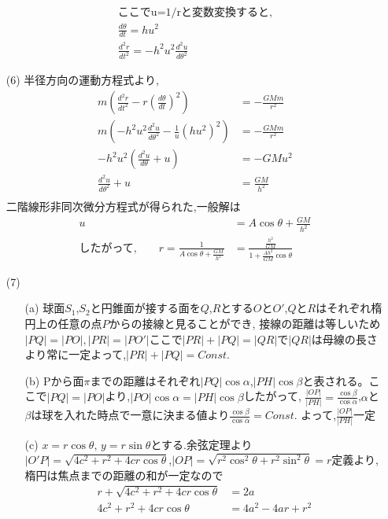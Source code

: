 \documentclass{jsarticle}
\begin{document}
\begin{itemize}
\begin{align*}
    \text{ここでu=1/rと変数変換すると,}\\
    \frac{d\theta}{dt} = hu^2\\
    \frac{d^2r}{dt^2} = -h^2u^2\frac{d^2u}{d\theta^2}
  \end{align*} 
  \item[(6)] 半径方向の運動方程式より,
  \begin{align*}
    m(\frac{d^2r}{dt^2} - r(\frac{d\theta}{dt})^2) &= -\frac{GMm}{r^2}\\
    m( -h^2u^2\frac{d^2u}{d\theta^2} -\frac{1}{u}(hu^2)^2) &= -\frac{GMm}{r^2}\\
    -h^2u^2(\frac{d^2u}{d\theta} + u) &= -GMu^2\\
    \frac{d^2u}{d\theta^2} + u &= \frac{GM}{h^2}\\
  \end{align*}  
二階線形非同次微分方程式が得られた,一般解は
  \begin{align*}
    u &= A\cos\theta + \frac{GM}{h^2}\\
    \text{したがって,}\qquad r = \frac{1}{A\cos\theta + \frac{GM}{h^2}} &= \frac{\frac{h^2}{GM}}{1+\frac{Ah^2}{GM}\cos\theta} 
  \end{align*}  
  \item[(7)]
  \begin{itemize}
    \item[(a)] 球面$S_1$,$S_2$と円錐面が接する面を$Q$,$R$とする$O$と$O'$,$Q$と$R$はそれぞれ楕円上の任意の点$P$からの接線と見ることができ,
    接線の距離は等しいため$|PQ|=|PO|,|PR|=|PO'|$ここで$|PR|+|PQ|=|QR|$で$|QR|$は母線の長さより常に一定よって,$|PR|+|PQ|=Const.$
    \leavevmode\\
    \item[(b)] Pから面$\pi$までの距離はそれぞれ$|PQ|\cos\alpha$,$|PH|\cos\beta$と表される。ここで$|PQ|=|PO|$より,$|PO|\cos\alpha = |PH|\cos\beta$したがって,
    $\frac{|OP|}{|PH|} = \frac{\cos\beta}{\cos\alpha}$,$\alpha$と$\beta$は球を入れた時点で一意に決まる値より$\frac{\cos\beta}{\cos\alpha} = Const.$
    よって,$\frac{|OP|}{|PH|}$一定 
    \leavevmode\\
    \item[(c)] $x=r\cos\theta,\,y=r\sin\theta$とする.余弦定理より$|O'P| = \sqrt{4c^2 + r^2 + 4cr\cos\theta}$,$|OP| = \sqrt{r^2\cos^2\theta+r^2\sin^2\theta} = r$定義より,楕円は焦点までの距離の和が一定なので
    \begin{align*}
      r+\sqrt{4c^2 + r^2 + 4cr\cos\theta} &= 2a\\
      4c^2 + r^2 + 4cr\cos\theta &= 4a^2 -4ar +r^2\\

\end{align*}
\end{itemize}
\end{itemize}
\end{document}
